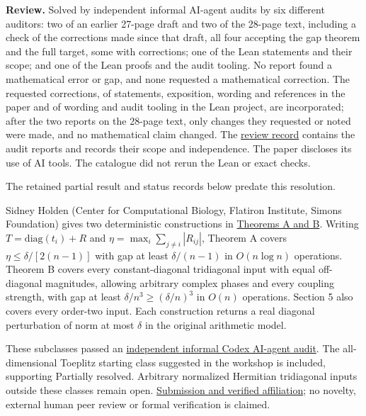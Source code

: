 \documentclass[11pt,a4paper]{article}
\makeatletter
\renewcommand{\subsection}{\Needspace{4\baselineskip}\@startsection{subsection}{2}{0pt}{9pt plus 1pt minus 1pt}{3pt}{\sffamily\bfseries\normalsize\color{ink}}}
\makeatother
\begin{document}
\textbf{Review.} Solved by independent informal AI-agent audits by six
different auditors: two of an earlier 27-page draft and two of the
28-page text, including a check of the corrections made since that
draft, all four accepting the gap theorem and the full target, some with
corrections; one of the Lean statements and their scope; and one of the
Lean proofs and the audit tooling. No report found a mathematical error
or gap, and none requested a mathematical correction. The requested
corrections, of statements, exposition, wording and references in the
paper and of wording and audit tooling in the Lean project, are
incorporated; after the two reports on the 28-page text, only changes
they requested or noted were made, and no mathematical claim changed.
The
\href{https://github.com/erenup/tridiagonal-spectral-separation/blob/660debbcdb3bb81a1965e2c1ade82db80889abb7/verification/reviews/README.md}{review
record} contains the audit reports and records their scope and
independence. The paper discloses its use of AI tools. The catalogue did
not rerun the Lean or exact checks.

The retained partial result and status records below predate this
resolution.

\subsection{Partial result --- 12 September
2026}\label{partial-result-12-september-2026}

Sidney Holden (Center for Computational Biology, Flatiron Institute,
Simons Foundation) gives two deterministic constructions in
\href{https://github.com/ajt60gaibb/OpenProblemsInNLA/blob/main/references/holden-spectral-2026-09-12/KE-02/proof.md}{Theorems
A and B}. Writing \(T=\mathrm{diag}(t_i)+R\) and
\(\eta=\max_i\sum_{j\ne i}|R_{ij}|\), Theorem A covers
\(\eta\le\delta/[2(n-1)]\) with gap at least \(\delta/(n-1)\) in
\(O(n\log n)\) operations. Theorem B covers every constant-diagonal
tridiagonal input with equal off-diagonal magnitudes, allowing arbitrary
complex phases and every coupling strength, with gap at least
\(\delta/n^3\ge(\delta/n)^3\) in \(O(n)\) operations. Section 5 also
covers every order-two input. Each construction returns a real diagonal
perturbation of norm at most \(\delta\) in the original arithmetic
model.

These subclasses passed an
\href{https://github.com/ajt60gaibb/OpenProblemsInNLA/blob/main/references/holden-spectral-2026-09-12/verification/KE-02-review.md}{independent
informal Codex AI-agent audit}. The all-dimensional Toeplitz starting
class suggested in the workshop is included, supporting Partially
resolved. Arbitrary normalized Hermitian tridiagonal inputs outside
these classes remain open.
\href{https://github.com/ajt60gaibb/OpenProblemsInNLA/blob/main/references/holden-spectral-2026-09-12/README.md}{Submission
and verified affiliation}; no novelty, external human peer review or
formal verification is claimed.
\end{document}

